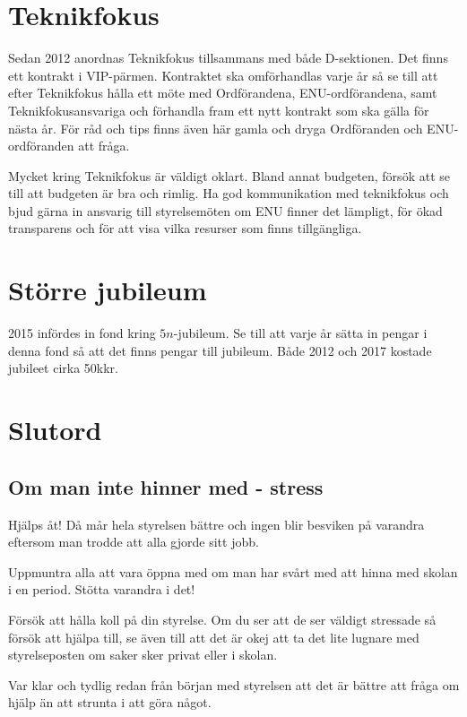\documentclass[10pt]{article}
\begin{document}
   \section{Teknikfokus}
    
    Sedan 2012 anordnas Teknikfokus tillsammans med både D-sektionen. Det finns ett kontrakt i VIP-pärmen. Kontraktet ska omförhandlas varje år så se till att efter Teknikfokus hålla ett möte med Ordförandena, ENU-ordförandena, samt Teknikfokusansvariga och förhandla fram ett nytt kontrakt som ska gälla för nästa år. För råd och tips finns även här gamla och dryga Ordföranden och ENU-ordföranden att fråga.
    
    Mycket kring Teknikfokus är väldigt oklart. Bland annat budgeten, försök att se till att budgeten är bra och rimlig. Ha god kommunikation med teknikfokus och bjud gärna in ansvarig till styrelsemöten om ENU finner det lämpligt, för ökad transparens och för att visa vilka resurser som finns tillgängliga.
    
    \section{Större jubileum}
    
    2015 infördes in fond kring $5n$-jubileum. Se till att varje år sätta in pengar i denna fond så att det finns pengar till jubileum. Både 2012 och 2017 kostade jubileet cirka 50kkr.
    
    \section{Slutord}
    
    \subsection{Om man inte hinner med - stress}
    
    \begin{dashlist}
        \item Hjälps åt! Då mår hela styrelsen bättre och ingen blir besviken på varandra eftersom man trodde att alla gjorde sitt jobb.
        \item Uppmuntra alla att vara öppna med om man har svårt med att hinna med skolan i en period. Stötta varandra i det!
        \item Försök att hålla koll på din styrelse. Om du ser att de ser väldigt stressade så försök att hjälpa till, se även till att det är okej att ta det lite lugnare med styrelseposten om saker sker privat eller i skolan.
        \item Var klar och tydlig redan från början med styrelsen att det är bättre att fråga om hjälp än att strunta i att göra något.
    \end{dashlist}
    
\end{document}
